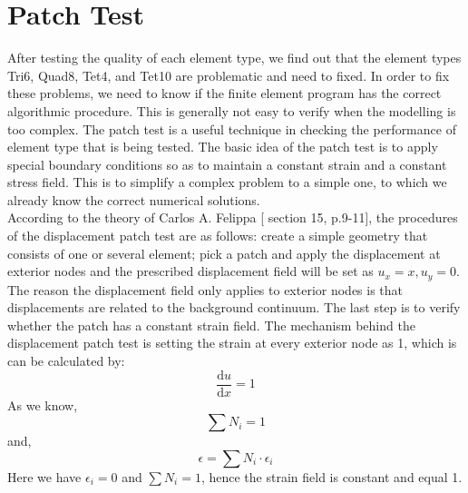 \section{Patch Test}
After testing the quality of each element type, we find out that the element types Tri6, Quad8, Tet4, and Tet10 are problematic and need to fixed. In order to fix these problems, we need to know if the finite element program has the correct algorithmic procedure. This is generally not easy to verify when the modelling is too complex. The patch test is a useful technique in checking the performance of element type that is being tested. The basic idea of the patch test is to apply special boundary conditions so as to maintain a constant strain and a constant stress field. This is to simplify a complex problem to a simple one, to which we already know the correct numerical solutions. \\
According to the theory of Carlos A. Felippa [\cite{Felippa} section 15, p.9-11], the procedures of the displacement patch test are as follows: create a simple geometry that consists of one or several element; pick a patch and apply the displacement at exterior nodes and the prescribed displacement field will be set as $u_x = x, u_y = 0$. The reason the displacement field only applies to exterior nodes is that displacements are related to the background continuum. The last step is to verify whether the patch has a constant strain field. The mechanism behind the displacement patch test is setting the strain at every exterior node as 1, which is can be calculated by:
\begin{equation}
\frac{\mathrm d u}{\mathrm d x} = 1
\end{equation}
As we know, 
\begin{equation}
\sum N_i = 1
\end{equation}
and, 
\begin{equation}
\epsilon = \sum N_i \cdot \epsilon_{i}
\end{equation}
Here we have $\epsilon_i = 0$ and $\sum N_i = 1$, hence the strain field is constant and equal 1. \\
